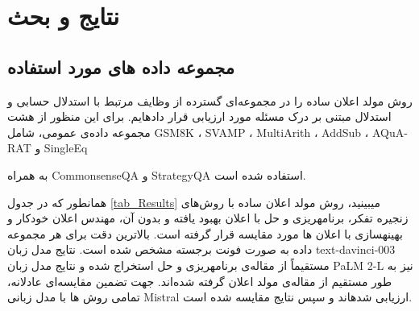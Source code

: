 \chapter{نتایج و بحث}\label{chap4}
\section{مجموعه داده های مورد استفاده}

روش مولد اعلان ساده را در مجموعه‌ای گسترده از وظایف مرتبط با استدلال حسابی
 و استدلال مبتنی بر درک مسئله
  مورد ارزیابی قرار داده\/ایم. برای این منظور از هشت مجموعه داده‌ی عمومی، شامل 
  GSM8K \cite{GSM8k}
   ،
  SVAMP \cite{SVAMP}
   ،
  MultiArith \cite{MultiArith}
   ،
  AddSub \cite{AddSub}
   ،
  AQuA-RAT \cite{AquaRat}
   و
  SingleEq \cite{SingleEQ}
  
   به همراه CommonsenseQA \cite{CSQA} و StrategyQA \cite{SQA} استفاده شده است.
   
همانطور که در جدول \ref{tab_Results} می\/بینید، روش مولد اعلان ساده با روش‌های زنجیره تفکر، برنامه\/ریزی و حل با اعلان بهبود یافته و بدون آن، مهندس اعلان خودکار و بهینه\/سازی با اعلان ها مورد مقایسه قرار گرفته است. بالاترین دقت برای هر مجموعه داده به صورت فونت برجسته مشخص شده است. نتایج مدل زبان text-davinci-003 مستقیماً از مقاله‌ی برنامه\/ریزی و حل \cite{PS} استخراج شده و نتایج مدل زبان PaLM 2-L نیز به طور مستقیم از مقاله‌ی مولد اعلان \cite{PromptBreeder} گرفته شده‌اند. جهت تضمین مقایسه‌ای عادلانه، تمامی روش ها با مدل زبانی Mistral ارزیابی شده\/اند و سپس نتایج مقایسه شده است.

